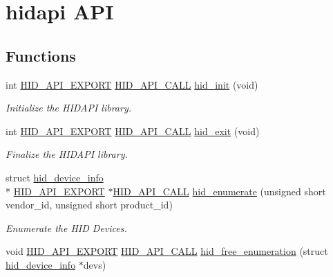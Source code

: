 \hypertarget{group__API}{\section{hidapi A\-P\-I}
\label{group__API}
}
\subsection*{Functions}
\begin{DoxyCompactItemize}
\item 
int \hyperlink{osx_2hidapi_8h_aa60150016800ccb88fdf140e8553ae13}{H\-I\-D\-\_\-\-A\-P\-I\-\_\-\-E\-X\-P\-O\-R\-T} \hyperlink{osx_2hidapi_8h_af140a25716604e86096670a505a58ee0}{H\-I\-D\-\_\-\-A\-P\-I\-\_\-\-C\-A\-L\-L} \hyperlink{group__API_ga142ffc1b0b7a7fa412d3862b2a17164b}{hid\-\_\-init} (void)
\begin{DoxyCompactList}\small\item\em Initialize the H\-I\-D\-A\-P\-I library. \end{DoxyCompactList}\item 
int \hyperlink{osx_2hidapi_8h_aa60150016800ccb88fdf140e8553ae13}{H\-I\-D\-\_\-\-A\-P\-I\-\_\-\-E\-X\-P\-O\-R\-T} \hyperlink{osx_2hidapi_8h_af140a25716604e86096670a505a58ee0}{H\-I\-D\-\_\-\-A\-P\-I\-\_\-\-C\-A\-L\-L} \hyperlink{group__API_gacf5da9ce37132eba69fc259f17f13023}{hid\-\_\-exit} (void)
\begin{DoxyCompactList}\small\item\em Finalize the H\-I\-D\-A\-P\-I library. \end{DoxyCompactList}\item 
struct \hyperlink{structhid__device__info}{hid\-\_\-device\-\_\-info} \\*
\hyperlink{osx_2hidapi_8h_aa60150016800ccb88fdf140e8553ae13}{H\-I\-D\-\_\-\-A\-P\-I\-\_\-\-E\-X\-P\-O\-R\-T} $\ast$\hyperlink{osx_2hidapi_8h_af140a25716604e86096670a505a58ee0}{H\-I\-D\-\_\-\-A\-P\-I\-\_\-\-C\-A\-L\-L} \hyperlink{group__API_ga135931e04d48078a9fb7aebf663676f9}{hid\-\_\-enumerate} (unsigned short vendor\-\_\-id, unsigned short product\-\_\-id)
\begin{DoxyCompactList}\small\item\em Enumerate the H\-I\-D Devices. \end{DoxyCompactList}\item 
void \hyperlink{osx_2hidapi_8h_aa60150016800ccb88fdf140e8553ae13}{H\-I\-D\-\_\-\-A\-P\-I\-\_\-\-E\-X\-P\-O\-R\-T} \hyperlink{osx_2hidapi_8h_af140a25716604e86096670a505a58ee0}{H\-I\-D\-\_\-\-A\-P\-I\-\_\-\-C\-A\-L\-L} \hyperlink{group__API_gafc2d2adf71db3784b783b9a554527aa4}{hid\-\_\-free\-\_\-enumeration} (struct \hyperlink{structhid__device__info}{hid\-\_\-device\-\_\-info} $\ast$devs)

\end{DoxyCompactItemize}
